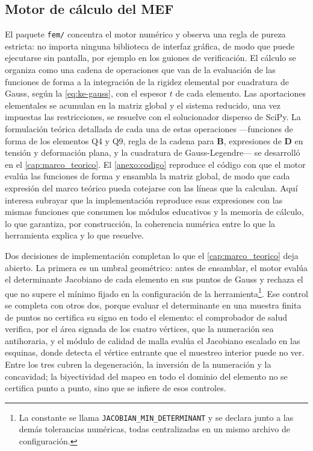 \subsection{Motor de cálculo del MEF}
\label{sec:motor}

El paquete \texttt{fem/} concentra el motor numérico y observa una regla de pureza estricta: no importa ninguna biblioteca de interfaz gráfica, de modo que puede ejecutarse sin pantalla, por ejemplo en los guiones de verificación. El cálculo se organiza como una cadena de operaciones que van de la evaluación de las funciones de forma a la integración de la rigidez elemental por cuadratura de Gauss, según la \autoref{eq:ke-gauss}, con el espesor $t$ de cada elemento. Las aportaciones elementales se acumulan en la matriz global y el sistema reducido, una vez impuestas las restricciones, se resuelve con el solucionador disperso de SciPy. La formulación teórica detallada de cada una de estas operaciones —funciones de forma de los elementos Q4 y Q9, regla de la cadena para $\bm{B}$, expresiones de $\bm{D}$ en tensión y deformación plana, y la cuadratura de Gauss-Legendre— se desarrolló en el \autoref{cap:marco_teorico}. El \autoref{anexo:codigo} reproduce el código con que el motor evalúa las funciones de forma y ensambla la matriz global, de modo que cada expresión del marco teórico pueda cotejarse con las líneas que la calculan. Aquí interesa subrayar que la implementación reproduce esas expresiones con las mismas funciones que consumen los módulos educativos y la memoria de cálculo, lo que garantiza, por construcción, la coherencia numérica entre lo que la herramienta explica y lo que resuelve.

Dos decisiones de implementación completan lo que el \autoref{cap:marco_teorico} deja abierto. La primera es un umbral geométrico: antes de ensamblar, el motor evalúa el determinante Jacobiano de cada elemento en sus puntos de Gauss y rechaza el que no supere el mínimo fijado en la configuración de la herramienta\footnote{La constante se llama \texttt{JACOBIAN\_MIN\_DETERMINANT} y se declara junto a las demás tolerancias numéricas, todas centralizadas en un mismo archivo de configuración.}. Ese control se completa con otros dos, porque evaluar el determinante en una muestra finita de puntos no certifica su signo en todo el elemento: el comprobador de salud verifica, por el área signada de los cuatro vértices, que la numeración sea antihoraria, y el módulo de calidad de malla evalúa el Jacobiano escalado en las esquinas, donde detecta el vértice entrante que el muestreo interior puede no ver. Entre los tres cubren la degeneración, la inversión de la numeración y la concavidad; la biyectividad del mapeo en todo el dominio del elemento no se certifica punto a punto, sino que se infiere de esos controles.

